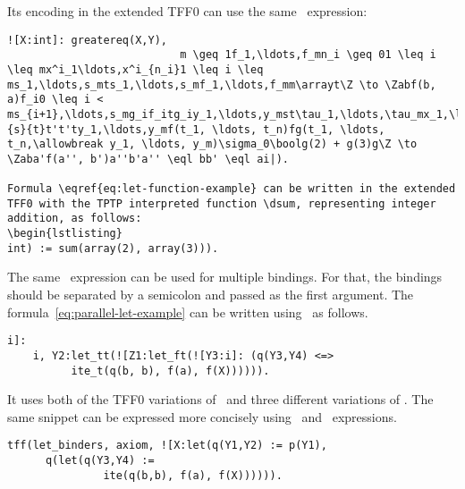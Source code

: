 Its encoding in the extended TFF0 can use the same \dite\ expression:
\begin{lstlisting}
![X:int]: greatereq(X,Y),
                           m \geq 1f_1,\ldots,f_mn_i \geq 01 \leq i \leq mx^i_1\ldots,x^i_{n_i}1 \leq i \leq ms_1,\ldots,s_mts_1,\ldots,s_mf_1,\ldots,f_mm\arrayt\Z \to \Zabf(b, a)f_i0 \leq i < ms_{i+1},\ldots,s_mg_if_itg_iy_1,\ldots,y_mst\tau_1,\ldots,\tau_mx_1,\ldots,x_ny_1,\ldots,y_m\sigma_0s\sigma_0\bool\sigma_0\boolgz_1,\ldots,z_ns'sx_1,\ldots,x_nz_1,\ldots,z_n\letin{f(x_1:\sigma_1,\ldots,x_n:\sigma_n)}{s}{t}t't'ty_1,\ldots,y_mf(t_1, \ldots, t_n)fg(t_1, \ldots, t_n,\allowbreak y_1, \ldots, y_m)\sigma_0\boolg(2) + g(3)g\Z \to \Zaba'f(a'', b')a''b'a'' \eql bb' \eql ai|).

Formula \eqref{eq:let-function-example} can be written in the extended TFF0 with the TPTP interpreted function \dsum, representing integer addition, as follows:
\begin{lstlisting}
int) := sum(array(2), array(3))).
\end{lstlisting}



The same \dlet\ expression can be used for multiple bindings. For that, the bindings should be separated by a semicolon and passed as the first argument. The formula~\eqref{eq:parallel-let-example} can be written using \dlet\ as follows.
\begin{lstlisting}
i]:
    i, Y2:let_tt(![Z1:let_ft(![Y3:i]: (q(Y3,Y4) <=>
          ite_t(q(b, b), f(a), f(X)))))).
\end{lstlisting}

It uses both of the TFF0 variations of \ITE\ and three different variations of \LETIN. The same snippet can be expressed more concisely using \dite\ and \dlet\ expressions.
\begin{lstlisting}
tff(let_binders, axiom, ![X:let(q(Y1,Y2) := p(Y1),
      q(let(q(Y3,Y4) :=
               ite(q(b,b), f(a), f(X)))))).
\end{lstlisting}
